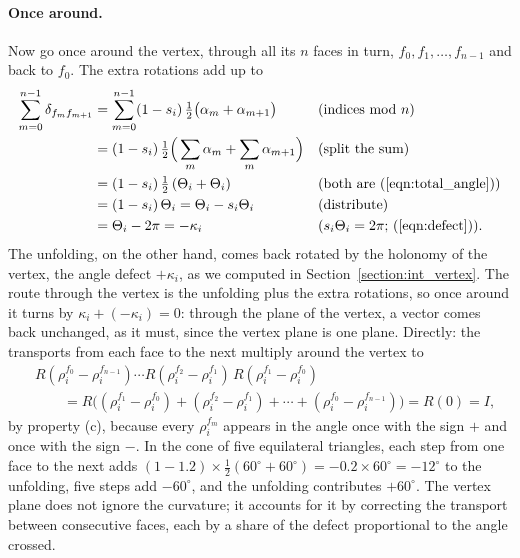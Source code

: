 \paragraph{Once around.} Now go once around the vertex, through all its $n$ faces in turn, $f_0, f_1, \ldots, f_{n-1}$ and back to $f_0$. The extra rotations add up to
\begin{align*}
\sum_{m=0}^{n-1} \delta_{f_m f_{m+1}} &= \sum_{m=0}^{n-1} (1 - s_i)\,\tfrac12\big(\alpha_m + \alpha_{m+1}\big) && \text{(indices mod $n$)} \\
&= (1 - s_i)\,\tfrac12\Big(\sum_m \alpha_m + \sum_m \alpha_{m+1}\Big) && \text{(split the sum)} \\
&= (1 - s_i)\,\tfrac12\,(\Theta_i + \Theta_i) && \text{(both are (\ref{eqn:total_angle}))} \\
&= (1 - s_i)\, \Theta_i = \Theta_i - s_i\Theta_i && \text{(distribute)} \\
&= \Theta_i - 2\pi = -\kappa_i && \text{($s_i\Theta_i = 2\pi$; (\ref{eqn:defect})).}
\end{align*}
The unfolding, on the other hand, comes back rotated by the holonomy of the vertex, the angle defect $+\kappa_i$, as we computed in Section~\ref{section:int_vertex}. The route through the vertex is the unfolding plus the extra rotations, so once around it turns by $\kappa_i + (-\kappa_i) = 0$: through the plane of the vertex, a vector comes back unchanged, as it must, since the vertex plane is one plane. Directly: the transports from each face to the next multiply around the vertex to
\begin{equation*}
\begin{aligned}
&R(\rho_i^{f_0} - \rho_i^{f_{n-1}}) \cdots R(\rho_i^{f_2} - \rho_i^{f_1})\, R(\rho_i^{f_1} - \rho_i^{f_0}) \\
&\qquad= R\big((\rho_i^{f_1} - \rho_i^{f_0}) + (\rho_i^{f_2} - \rho_i^{f_1}) + \cdots + (\rho_i^{f_0} - \rho_i^{f_{n-1}})\big) = R(0) = I ,
\end{aligned}
\end{equation*}
by property (c), because every $\rho_i^{f_m}$ appears in the angle once with the sign $+$ and once with the sign $-$. In the cone of five equilateral triangles, each step from one face to the next adds $(1 - 1.2) \times \frac12(60^\circ + 60^\circ) = -0.2 \times 60^\circ = -12^\circ$ to the unfolding, five steps add $-60^\circ$, and the unfolding contributes $+60^\circ$. The vertex plane does not ignore the curvature; it accounts for it by correcting the transport between consecutive faces, each by a share of the defect proportional to the angle crossed.

